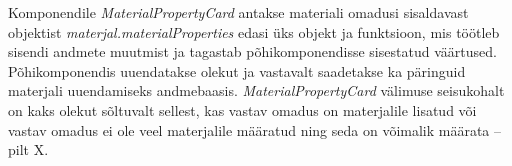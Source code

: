 Komponendile \textit{MaterialPropertyCard} antakse materiali omadusi sisaldavast objektist
\textit{materjal.materialProperties} edasi üks objekt ja funktsioon, mis töötleb sisendi andmete muutmist
ja tagastab põhikomponendisse sisestatud väärtused. Põhikomponendis uuendatakse olekut ja vastavalt
saadetakse ka päringuid materjali uuendamiseks andmebaasis.
\textit{MaterialPropertyCard} välimuse seisukohalt on kaks olekut sõltuvalt sellest, kas vastav omadus on materjalile lisatud
või vastav omadus ei ole veel materjalile määratud ning seda on võimalik määrata -- pilt X.
